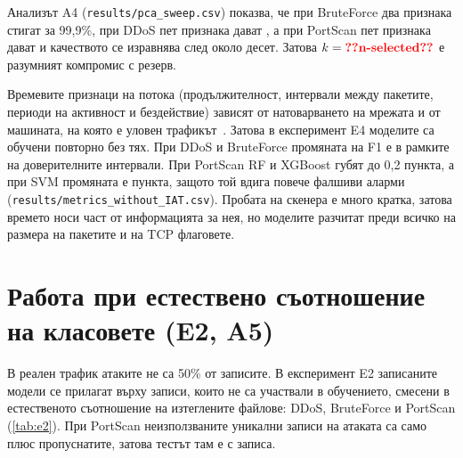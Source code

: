 Анализът A4 (\texttt{results/pca\_sweep.csv}) показва, че при BruteForce два признака стигат за 99,9\%, при DDoS пет признака дават , а при PortScan пет признака дават  и качеството се изравнява след около десет. Затова $k=\val{n-selected}$ е разумният компромис с резерв.

Времевите признаци на потока (продължителност, интервали между пакетите, периоди на активност и бездействие) зависят от натоварването на мрежата и от машината, на която е уловен трафикът~\cite{arp2022,engelen2021}. Затова в експеримент E4 моделите са обучени повторно без тях. При DDoS и BruteForce промяната на F1 е в рамките на доверителните интервали. При PortScan RF и XGBoost губят до 0,2 пункта, а при SVM промяната е  пункта, защото той вдига повече фалшиви аларми (\texttt{results/metrics\_without\_IAT.csv}). Пробата на скенера е много кратка, затова времето носи част от информацията за нея, но моделите разчитат преди всичко на размера на пакетите и на TCP флаговете.

\section{Работа при естествено съотношение на класовете (E2, A5)}\label{sec:r-nat}

В реален трафик атаките не са 50\% от записите. В експеримент E2 записаните модели се прилагат върху записи, които не са участвали в обучението, смесени в естественото съотношение на изтеглените файлове:  DDoS,  BruteForce и  PortScan (\cref{tab:e2}). При PortScan неизползваните уникални записи на атаката са само  плюс пропуснатите, затова тестът там е с  записа.

\begin{table}[H]
\centering\small
\caption{Резултати при естествено съотношение на класовете (E2)}\label{tab:e2}

\vspace{2pt}
\end{table}


